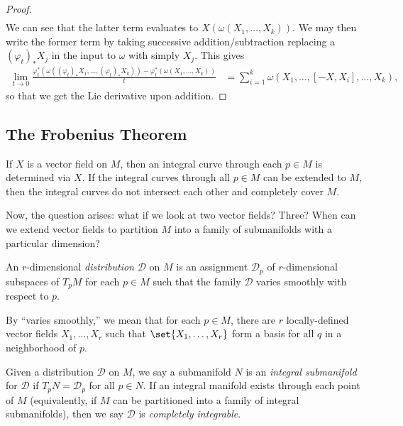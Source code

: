 \documentclass[10pt]{mypackage}
\begin{document}
\begin{proof}
\begin{align*}
  \end{align*}
  We can see that the latter term evaluates to $X\left( \omega\left( X_1,\dots,X_k \right) \right)$. We may then write the former term by taking successive addition/subtraction replacing a $\left( \varphi_{t} \right)_{\ast}X_j$ in the input to $\omega$ with simply $X_j$. This gives
  \begin{align*}
    \lim_{t\rightarrow 0} \frac{\varphi_t^{\ast}\left( \omega\left( \left( \varphi_t \right)_{\ast}X_1,\dots,\left( \varphi_t \right)_{\ast}X_k \right) \right) - \varphi_t^{\ast}\left( \omega\left( X_1,\dots,X_k \right) \right)}{t} &= \sum_{i=1}^{k} \omega\left( X_1,\dots,\left[ -X,X_i \right],\dots,X_k \right),
  \end{align*}
  so that we get the Lie derivative upon addition.
\end{proof}
\subsection{The Frobenius Theorem}%
If $X$ is a vector field on $M$, then an integral curve through each $p\in M$ is determined via $X$. If the integral curves through all $p\in M$ can be extended to $M$, then the integral curves do not intersect each other and completely cover $M$.\newline

Now, the question arises: what if we look at two vector fields? Three? When can we extend vector fields to partition $M$ into a family of submanifolds with a particular dimension?
\begin{definition}
  An $r$-dimensional \textit{distribution} $\mathcal{D}$ on $M$ is an assignment $ \mathcal{D}_p $ of $r$-dimensional subspaces of $T_pM$ for each $p\in M$ such that the family $ \mathcal{D} $ varies smoothly with respect to $p$.\newline

  By ``varies smoothly,'' we mean that for each $p\in M$, there are $r$ locally-defined vector fields $X_1,\dots,X_r$ such that $\set{X_1,\dots,X_r}$ form a basis for all $q$ in a neighborhood of $p$.
\end{definition}
\begin{definition}
  Given a distribution $\mathcal{D}$ on $M$, we say a submanifold $N$ is an \textit{integral submanifold} for $\mathcal{D}$ if $T_pN = \mathcal{D}_p$ for all $p\in N$. If an integral manifold exists through each point of $M$ (equivalently, if $M$ can be partitioned into a family of integral submanifolds), then we say $ \mathcal{D} $ is \textit{completely integrable}.
\end{definition}
\end{document}
